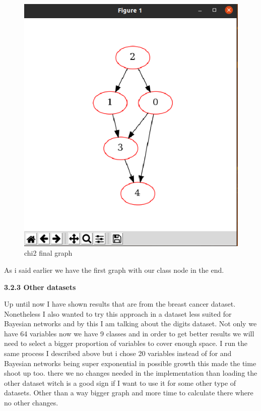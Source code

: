 \documentclass{article} %
\begin{document}
\begin{figure}[h!]
  \includegraphics[width=\linewidth]{chi2-final-graph.png}
  \caption{chi2 final graph}
  \label{fig:basic graph}
\end{figure}
\bigskip
\bigskip
\bigskip
\bigskip
\bigskip
\bigskip
\bigskip
\bigskip
\bigskip
\bigskip
\bigskip
\bigskip
\bigskip
\bigskip
\bigskip
\bigskip
\bigskip
\bigskip
\bigskip
\bigskip
\bigskip
\bigskip
\bigskip
\bigskip
\bigskip
\bigskip
\bigskip
\bigskip
\bigskip
\bigskip
 
As i said earlier we have the first graph with our class node in the end.
\bigskip
\begin{normalsize}
\textbf{3.2.3   Other datasets}
\end{normalsize}
Up until now I have shown results that are from the breast cancer dataset. Nonetheless I also wanted to try this approach in a dataset less suited for Bayesian networks and by this I am talking about the digits dataset. Not only we have 64 variables now we have 9 classes and in order to get better results we will need to select a bigger proportion of variables to cover enough space.
\bigskip
I run the same process I described above but i chose 20 variables instead of for and Bayesian networks being super exponential in possible growth this made the time shoot up too. there we no changes needed in the implementation than loading the other dataset witch is a good sign if I want to use it for some other type of datasets.
\bigskip
Other than a way bigger graph and more time to calculate there where no other changes.
\end{document}
